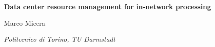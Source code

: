 \begin{titlepage}
    \begin{center}
        \vspace*{7cm}
 
        \Huge
        \textbf{Data center resource management for in-network processing}
 
        \vspace{1cm}
        
        \huge
        Marco Micera
 
        \vfill
 
        \LARGE
        \textit{Politecnico di Torino, TU Darmstadt}
    \end{center}
\end{titlepage}